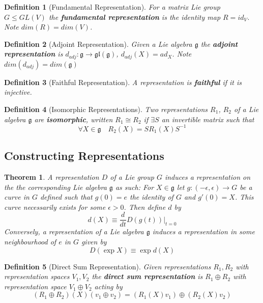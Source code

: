 \documentclass{article}
\newtheorem{theorem}{Theorem}[subsection]
\newtheorem{definition}{Definition}[subsection]
\newcommand{\bam}[1]{\textbf{#1}}
\newcommand{\mf}[1]{\mathfrak{#1}}
\begin{document}
\begin{definition}[Fundamental Representation]
For a matrix Lie group $G\leq GL(V)$ the \bam{fundamental representation} is the identity map $R=id_V$. Note $dim\left(R\right)=dim\left(V\right)$.
\end{definition}

\begin{definition}[Adjoint Representation]
Given a Lie algebra $\mf{g}$ the \bam{adjoint representation} is $d_{adj}:\mf{g}\to\mf{gl}(\mf{g})$, $d_{adj}\left(X\right)=ad_X $. Note $dim\left(d_{adj}\right)=dim\left(\mf{g}\right)$
\end{definition}

\begin{definition}[Faithful Representation]
A representation is \bam{faithful} if it is injective. 
\end{definition}

\begin{definition}[Isomorphic Representations]
Two representations $R_1$, $R_2$ of a Lie algebra $\mf{g}$ are \bam{isomorphic}, written $R_1 \cong R_2$ if $\exists S$ an invertible matrix such that 
\[
\forall X\in\mf{g} \quad R_2\left(X\right)=S R_1\left(X\right) S^{-1}
\]
\end{definition}
\subsection{Constructing Representations}

\begin{theorem}
A representation $D$ of a Lie group $G$ induces a representation on the the corresponding Lie algebra $\mf{g}$ as such: For $X\in\mf{g}$ let $g:(-\epsilon, \epsilon)\to G$ be a curve in $G$ defined such that $g(0)=e$ the identity of $G$ and $g'(0)=X$. This curve necessarily exists for some $\epsilon>0$. Then define $d$ by \[
d(X)\equiv\frac{d}{dt} D\left(g(t)\right) \vert_{t=0}
\]
Conversely, a representation of a Lie algebra $\mf{g}$ induces a representation in some neighbourhood of $e$ in $G$ given by 
\[
D(\exp{X})\equiv\exp{d(X)}
\]
\end{theorem}

\begin{definition}[Direct Sum Representation]
Given representations $R_1, R_2$ with representation spaces $V_1, V_2$ the \bam{direct sum representation} is $R_1 \oplus R_2$ with representation space $V_1 \oplus V_2$ acting by 
\[
(R_1 \oplus R_2)(X)(v_1 \oplus v_2)=(R_1(X)v_1)\oplus(R_2(X)v_2)
\]
\end{definition}
\end{document}

